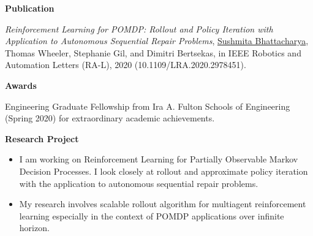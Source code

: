 \documentclass[a4paper,11pt]{article}
\newcommand{\resheading}[1]{{\small \colorbox{mygrey}{\begin{minipage}{0.975\textwidth}{\textbf{#1 \vphantom{p\^{E}}}}\end{minipage}}}}
\begin{document}
\resheading{\textbf{\large Publication}}
\begin{description}
	\item \hspace{0.65 cm} \textit{Reinforcement Learning for POMDP: Rollout and Policy Iteration with Application to Autonomous Sequential Repair Problems}, \underline{Sushmita Bhattacharya}, Thomas Wheeler, Stephanie Gil, and Dimitri Bertsekas, in IEEE Robotics and Automation Letters (RA-L), 2020 (10.1109/LRA.2020.2978451).
\end{description}

\resheading{\textbf{\large Awards}}
\begin{description}
	\item \hspace{0.65 cm} Engineering Graduate Fellowship from Ira A. Fulton Schools of Engineering (Spring 2020) for extraordinary academic achievements.
	
\end{description}

\resheading{\textbf{\large Research Project}}
\begin{description}
	\item 
	\begin{itemize}
		\item I am working on Reinforcement Learning for Partially Observable Markov Decision Processes. I look closely  at rollout and approximate policy iteration with the application to autonomous sequential repair problems.
	\end{itemize}
\item 
	\begin{itemize}
		\item My research involves scalable rollout algorithm for multiagent reinforcement learning especially in the context of POMDP applications over infinite horizon.
	\end{itemize}
\end{description}
\end{document}
